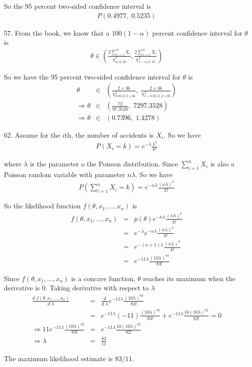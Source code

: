\documentclass[12pt]{article}
\begin{document}
So the 95 percent two-sided confidence interval is
\begin{eqnarray*}
  P \left(0.4977, \; 0.5235 \right)
\end{eqnarray*}

57. From the book, we know that a $100(1 - \alpha)$ percent confidence interval for $\theta$ is
\begin{eqnarray*}
  \theta \in \left(
    \frac {2 \sum_{i=1}^n X_i}{\chi_{\alpha / 2, 2n}^2}
    , \frac{2 \sum_{i=1}^n X_i}{\chi_{1-\alpha / 2, 2n}^2} \right)
\end{eqnarray*}

So we have the 95 percent two-sided confidence interval for $\theta$ is
\begin{eqnarray*}
  \theta &\in& \left(
    \frac {2 \times 36}{\chi_{0.05 / 2, 2 \times 36}^2}
    , \; \frac {2 \times 36}{\chi_{1-0.05 / 2, 2\times 36}^2} \right) \\
  \Rightarrow \theta  &\in& \left( \frac {72}{97.3528},
    \; {72}{97.3528} \right) \\
    \Rightarrow \theta  &\in& \left( 0.7396, \; 1.4278 \right)
\end{eqnarray*}

62. Assume for the $i$th, the number of accidents is $X_i$. So we have
\begin{eqnarray*}
    P(X_i = k) = e^{-\lambda} \frac {\lambda^k}{k!}
\end{eqnarray*}

where $\lambda$ is the parameter o the Poisson distribution. Since $\sum_{i=1}^n X_i$ is also a Poisson random variable with parameter $n\lambda$. So we have
\begin{eqnarray*}
    P(\sum_{i=1}^n X_i = k) = e^{-n\lambda} \frac {(n\lambda)^k}{k!}
\end{eqnarray*}

So the likelihood function $f(\theta, x_1, \dots, x_n)$ is
\begin{eqnarray*}
    f(\theta, x_1, \dots, x_n)
    &=& p(\theta)e^{-n\lambda} \frac {(n\lambda)^k}{k!} \\
    &=& e^{-\lambda}e^{-n\lambda} \frac {(n\lambda)^k}{k!} \\
    &=& e^{-(n+1)\lambda} \frac {(n\lambda)^k}{k!} \\
    &=& e^{-11\lambda} \frac {(10\lambda)^{83}}{83!}
\end{eqnarray*}

Since $f(\theta, x_1, \dots, x_n)$ is a concave function, $\theta$ reaches its maximum when the derivative is 0. Taking derivative with respect to $\lambda$
\begin{eqnarray*}
    \frac {d \; f(\theta, x_1, \dots, x_n)}{d \; \lambda}
    &=& \frac {d}{d \; \lambda} e^{-11\lambda} \frac {(10\lambda)^{83}}{83!} \\
    &=& e^{-11 \lambda}(-11) \frac {(10\lambda)^{83}}{83!}
    + e^{-11\lambda} \frac {10 (10\lambda)^{82}}{82!} = 0 \\
    \Rightarrow  11 e^{-11 \lambda} \frac {(10\lambda)^{83}}{83!}
    &=& e^{-11\lambda} \frac {10 (10\lambda)^{82}}{82!} \\
    \Rightarrow \lambda &=& \frac {83}{11}
\end{eqnarray*}

The maximum likelihood estimate is $83/11$.
\end{document}
